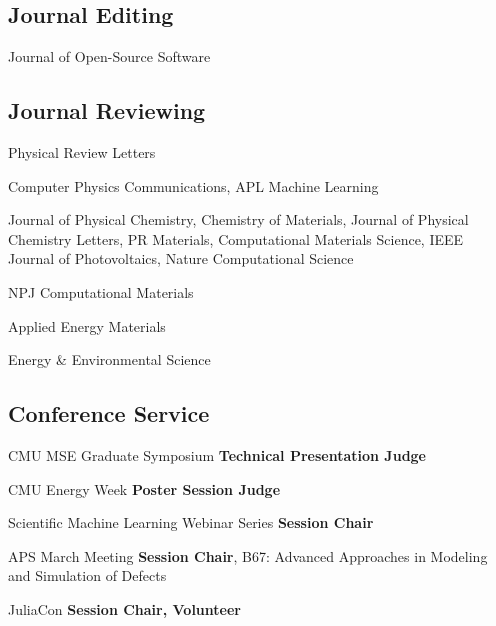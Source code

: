 \subsection{Journal Editing}
{}
{Journal of Open-Source Software}
{}

\vspace{-2mm}
\subsection{Journal Reviewing}

                      {}
                      {Physical Review Letters}
                      {}

{}
{Computer Physics Communications, APL Machine Learning}
{}

{}
{Journal of Physical Chemistry, Chemistry of Materials, Journal of Physical Chemistry Letters, PR Materials, Computational Materials Science, IEEE Journal of Photovoltaics, Nature Computational Science}
{}

{}
{NPJ Computational Materials}
{}

{}
{Applied Energy Materials}
{}

{}
{Energy \& Environmental Science}
{}

\vspace{-2mm}
\subsection{Conference Service}
\vspace{-1mm}
{CMU MSE Graduate Symposium}
{\textbf{Technical Presentation Judge}}
{}

{CMU Energy Week}
{\textbf{Poster Session Judge}}
{}


{Scientific Machine Learning Webinar Series}
{\textbf{Session Chair}}
{}

{APS March Meeting}
{\textbf{Session Chair}, B67: Advanced Approaches in Modeling and Simulation of Defects}
{}
\vspace{1mm}

{JuliaCon}
{\textbf{Session Chair, Volunteer}}
{}

